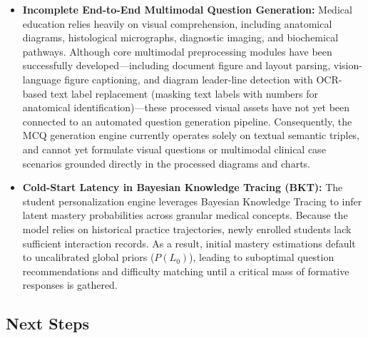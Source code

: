 \begin{itemize}
    \item \textbf{Incomplete End-to-End Multimodal Question Generation:}
          Medical education relies heavily on visual comprehension, including anatomical diagrams, histological micrographs, diagnostic imaging, and biochemical pathways. Although core multimodal preprocessing modules have been successfully developed---including document figure and layout parsing, vision-language figure captioning, and diagram leader-line detection with OCR-based text label replacement (masking text labels with numbers for anatomical identification)---these processed visual assets have not yet been connected to an automated question generation pipeline. Consequently, the MCQ generation engine currently operates solely on textual semantic triples, and cannot yet formulate visual questions or multimodal clinical case scenarios grounded directly in the processed diagrams and charts.

    \item \textbf{Cold-Start Latency in Bayesian Knowledge Tracing (BKT):}
          The student personalization engine leverages Bayesian Knowledge Tracing to infer latent mastery probabilities across granular medical concepts. Because the model relies on historical practice trajectories, newly enrolled students lack sufficient interaction records. As a result, initial mastery estimations default to uncalibrated global priors ($P(L_0)$), leading to suboptimal question recommendations and difficulty matching until a critical mass of formative responses is gathered.
\end{itemize}

\subsection*{Next Steps}

